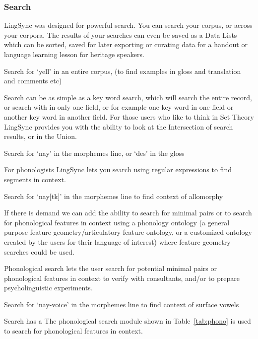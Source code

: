\documentclass[letterpaper, 12pt, dvips]{mitwpl}
\begin{document}
\subsubsection{Search}

LingSync was designed for powerful search. You can search your corpus, or across your corpora. The results of your searches can even be saved as a Data Lists which can be sorted, saved for later exporting or curating data for a handout or language learning lesson for heritage speakers. 


\begin{exe}
	\ex Search for  `yell' in an entire corpus, (to find examples in gloss and translation and comments etc)
\end{exe}

Search can be as simple as a key word search, which will search the entire record, or search with in only one field, or for example one key word in one field or another key word in another field. For those users who like to think in Set Theory LingSync provides you with the ability to look at the Intersection of search results, or in the Union. 

\begin{exe}
	\ex Search for  `nay' in the morphemes line, or `des' in the gloss
\end{exe}

For phonologists LingSync lets you search using regular expressions to find segments in context.


\begin{exe}
	\ex Search for  `nay[tk]' in the morphemes line to find context of allomorphy
\end{exe}

If there is demand we can add the ability to search for minimal pairs or to search for phonological features in context using a phonology ontology (a general purpose feature geometry/articulatory feature ontology, or a customized ontology created by the users for their language of interest)  where feature geometry searches could be used. 

Phonological search lets the user search for potential minimal pairs or phonological features in context to verify with consultants, and/or to prepare psycholinguistic experiments. 

\begin{exe}
	\ex Search for  `nay-voice' in the morphemes line to find context of surface vowels
\end{exe}

Search has a 
The phonological search module shown in Table~\ref{tab:phono} is used to search for phonological features in context. 
\end{document}
